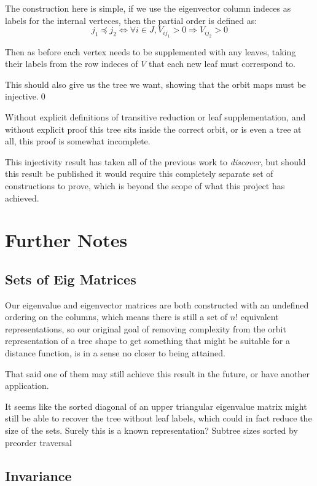 \documentclass[10pt,a4paper]{report}
\begin{document}
The construction here is simple, if we use the eigenvector column indeces as
labels for the internal verteces, then the partial order is defined as:
\[j_1 \preccurlyeq j_2 \Leftrightarrow \forall i \in J, V_{ij_1} > 0
\Rightarrow V_{ij_2} > 0 \]

Then as before each vertex needs to be supplemented with any leaves, taking their
labels from the row indeces of $V$ that each new leaf must correspond to.

This should also give us the tree we want, showing that the orbit maps must be injective.\qed

Without explicit definitions of transitive reduction or leaf supplementation, and without explicit proof this tree sits inside the correct orbit, or is even a tree at all, this proof is somewhat incomplete.

This injectivity result has taken all of the previous work to \emph{discover}, but should this result be published it would require this completely separate set of constructions to prove, which is beyond the scope of what this project has achieved.

\chapter{Further Notes}

\section{Sets of Eig Matrices}

Our eigenvalue and eigenvector matrices are both constructed with an undefined ordering on the columns, which means there is still a set of $n!$ equivalent representations, so our original goal of removing complexity from the orbit representation of a tree shape to get something that might be suitable for a distance function, is in a sense no closer to being attained.

That said one of them may still achieve this result in the future, or have another application.

It seems like the sorted diagonal of an upper triangular eigenvalue matrix might still be able to recover the tree without leaf labels, which could in fact reduce the size of the sets. Surely this is a known representation? Subtree sizes sorted by preorder traversal

\section{Invariance}
\end{document}
